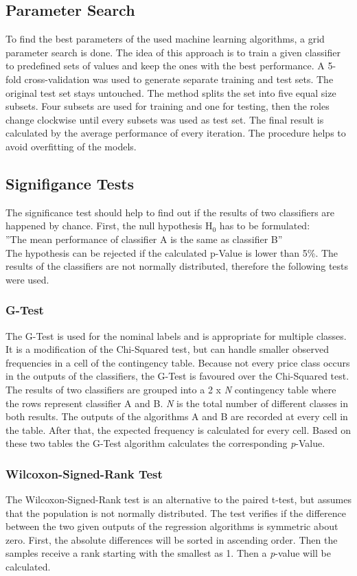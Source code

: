 \subsection{Parameter Search}
To find the best parameters of the used machine learning algorithms, a grid parameter search is done. The idea of this approach is to train a given classifier to predefined sets of values and keep the ones with the best performance. A 5-fold cross-validation was used to generate separate training and test sets. The original test set stays untouched. The method splits the set into five equal size subsets. Four subsets are used for training and one for testing, then the roles change clockwise until every subsets was used as test set. The final result is calculated by the average performance of every iteration. The procedure helps to avoid overfitting of the models.
\subsection{Signifigance Tests}
The significance test should help to find out if the results of two classifiers are happened by chance. First, the null hypothesis H$_{0}$ has to be formulated:\\

''The mean performance of classifier A is the same as classifier B''\\

The hypothesis can be rejected if the calculated p-Value is lower than 5\%. The results of the classifiers are not normally distributed, therefore the following tests were used. 
\subsubsection{G-Test}
The G-Test\cite{gtest} is used for the nominal labels and is appropriate for multiple classes. It is a modification of the Chi-Squared test, but can handle smaller observed frequencies in a cell of the contingency table. Because not every price class occurs in the outputs of the classifiers, the G-Test is favoured over the Chi-Squared test. The results of two classifiers are grouped into a 2 x \textit{N} contingency table where the rows represent classifier A and B. \textit{N} is the total number of different classes in both results. The outputs of the algorithms A and B are recorded at every cell in the table. After that, the expected frequency is calculated for every cell. Based on these two tables the G-Test algorithm calculates the corresponding \textit{p}-Value. 
\subsubsection{Wilcoxon-Signed-Rank Test}
The Wilcoxon-Signed-Rank test\cite{wilcoxon} is an alternative to the paired t-test, but assumes that the population is not normally distributed. The test verifies if the difference between the two given outputs of the regression algorithms is symmetric about zero. First, the absolute differences will be sorted in ascending order. Then the samples receive a rank starting with the smallest as 1. Then a \textit{p}-value will be calculated.
